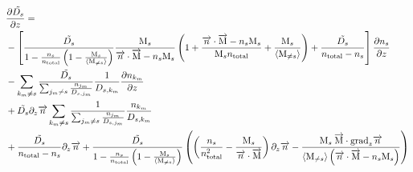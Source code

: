 \begin{landscape}
\begin{equation}
\begin{split}
& \frac{\partial\tilde{D_s}}{\partial z}  = \\
          & - \left[\frac{\tilde{D_s}}{1-\frac{n_s}{n_\text{total}}\left(1 - \frac{\text{M}_s}{\langle\text{M}_{\neq s}\rangle}\right)}
                  \frac{\text{M}_s}{\overrightarrow{n}\cdot\overrightarrow{\text{M}} - n_s\text{M}_s} 
                        \left(1 + \frac{\overrightarrow{n}\cdot\overrightarrow{\text{M}} - n_s\text{M}_s}{\text{M}_sn_\text{total}} + \frac{\text{M}_s}{\langle\text{M}_{\neq s}\rangle}\right)
                  + \frac{\tilde{D_s}}{n_\text{total} - n_s}\right]
                \frac{\partial n_s}{\partial z} \\
          & - \sum_{k_m\neq s}\frac{\tilde{D_s}}{\sum_{j_m \neq s}\frac{n_{j_m}}{D_{s,j_m}}}
                                \frac{1}{D_{s,k_m}} \frac{\partial n_{k_m}}{\partial z} \\
          & +  \tilde{D_s}\partial_{z}{\overrightarrow{n}} \sum_{k_m\neq s}
                           \frac{1}{\sum_{j_m \neq s}\frac{n_{j_m}}{D_{s,j_m}}}
                                        \frac{n_{k_m}}{D_{s,k_m}} \\
          & + \frac{\tilde{D_s}}{n_\text{total} - n_s}\partial_{z}{\overrightarrow{n}} 
            + \frac{\tilde{D_s}}{1-\frac{n_s}{n_\text{total}}\left(1 - \frac{\text{M}_s}{\langle\text{M}_{\neq s}\rangle}\right)}
              \left(\left(\frac{n_s}{n_\text{total}^2} - \frac{\text{M}_s}{\overrightarrow{n}\cdot\overrightarrow{\text{M}}}\right)\partial_{z}{\overrightarrow{n}}
                        - \frac{\text{M}_s\:\overrightarrow{\text{M}}\cdot\text{grad}_{z}\overrightarrow{n}}
                               {\langle\text{M}_{\neq s}\rangle\left(\overrightarrow{n}\cdot\overrightarrow{\text{M}} - n_s\text{M}_s\right)}
                    \right)\\
\end{split}
\label{Titan:diff_deriv_D_tilde}
\end{equation}
\end{landscape}


